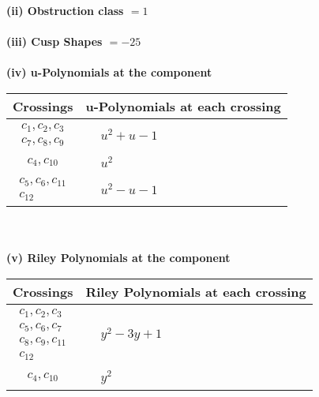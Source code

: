 \documentclass[1p]{elsarticle_modified}
\theoremstyle{definition}
\begin{document}
\flushleft \textbf{(ii) Obstruction class $= 1$}\\~\\
\flushleft \textbf{(iii) Cusp Shapes $= -25$}\\~\\
\newpage\renewcommand{\arraystretch}{1}
\flushleft \textbf{(iv) u-Polynomials at the component}\newline \\
\begin{tabular}{m{50pt}|m{274pt}}
Crossings & \hspace{64pt}u-Polynomials at each crossing \\
\hline $$\begin{aligned}c_{1},c_{2},c_{3}\\c_{7},c_{8},c_{9}\end{aligned}$$&$\begin{aligned}
&u^2+u-1
\end{aligned}$\\
\hline $$\begin{aligned}c_{4},c_{10}\end{aligned}$$&$\begin{aligned}
&u^2
\end{aligned}$\\
\hline $$\begin{aligned}c_{5},c_{6},c_{11}\\c_{12}\end{aligned}$$&$\begin{aligned}
&u^2- u-1
\end{aligned}$\\
\hline
\end{tabular}\\~\\
\newpage\renewcommand{\arraystretch}{1}
\flushleft \textbf{(v) Riley Polynomials at the component}\newline \\
\begin{tabular}{m{50pt}|m{274pt}}
Crossings & \hspace{64pt}Riley Polynomials at each crossing \\
\hline $$\begin{aligned}c_{1},c_{2},c_{3}\\c_{5},c_{6},c_{7}\\c_{8},c_{9},c_{11}\\c_{12}\end{aligned}$$&$\begin{aligned}
&y^2-3 y+1
\end{aligned}$\\
\hline $$\begin{aligned}c_{4},c_{10}\end{aligned}$$&$\begin{aligned}
&y^2
\end{aligned}$\\
\hline
\end{tabular}\\~\\
\end{document}
